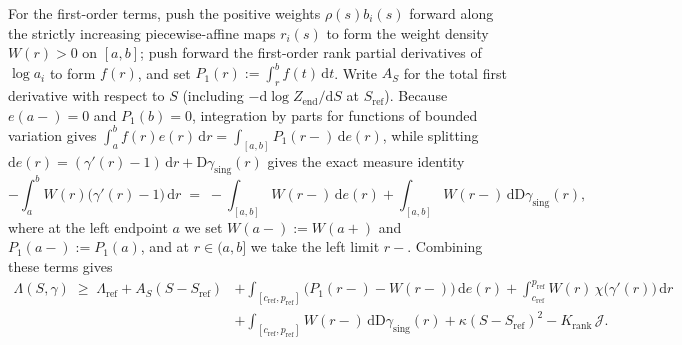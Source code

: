 \documentclass[11pt]{article}
\numberwithin{equation}{section}
\theoremstyle{plain}
\theoremstyle{definition}
\newcommand{\1}{\mathbf{1}}
\newcommand{\calJ}{\mathcal{J}}
\begin{document}
For the first-order terms, push the positive weights $\rho(s)b_i(s)$ forward along the strictly increasing piecewise-affine maps $r_i(s)$ to form the weight density $W(r) > 0$ on $[a, b]$; push forward the first-order rank partial derivatives of $\log a_i$ to form $f(r)$, and set $P_1(r) := \int_r^b f(t)\,\mathrm{d}t$. Write $A_S$ for the total first derivative with respect to $S$ (including $-\mathrm{d}\log Z_{\mathrm{end}}/\mathrm{d}S$ at $S_{\mathrm{ref}}$). Because $e(a-) = 0$ and $P_1(b) = 0$, integration by parts for functions of bounded variation gives $\int_a^b f(r)e(r)\,\mathrm{d}r = \int_{[a, b]} P_1(r-)\,\mathrm{d}e(r)$, while splitting $\mathrm{d}e(r) = (\gamma'(r) - 1)\,\mathrm{d}r + \mathrm{D}\gamma_{\mathrm{sing}}(r)$ gives the exact measure identity
\[
  -\int_a^b W(r)\bigl(\gamma'(r) - 1\bigr)\,\mathrm{d}r
  \;=\; -\int_{[a, b]} W(r-)\,\mathrm{d}e(r) + \int_{[a, b]} W(r-)\,\mathrm{d}\mathrm{D}\gamma_{\mathrm{sing}}(r),
\]
where at the left endpoint $a$ we set $W(a-) := W(a+)$ and $P_1(a-) := P_1(a)$, and at $r \in (a, b]$ we take the left limit $r-$. Combining these terms gives
\begin{equation}
  \begin{aligned}
    \Lambda(S, \gamma) \;\ge\; \Lambda_{\mathrm{ref}} + A_S(S - S_{\mathrm{ref}})
    &+ \int_{[c_{\mathrm{ref}}, p_{\mathrm{ref}}]} \bigl(P_1(r-) - W(r-)\bigr)\,\mathrm{d}e(r)
    + \int_{c_{\mathrm{ref}}}^{p_{\mathrm{ref}}} W(r)\,\chi\bigl(\gamma'(r)\bigr)\,\mathrm{d}r \\
    &+ \int_{[c_{\mathrm{ref}}, p_{\mathrm{ref}}]} W(r-)\,\mathrm{d}\mathrm{D}\gamma_{\mathrm{sing}}(r)
    + \kappa(S - S_{\mathrm{ref}})^2 - K_{\mathrm{rank}}\,\calJ.
  \end{aligned}
  \label{eq:adjoint-expansion}
\end{equation}
\end{document}
